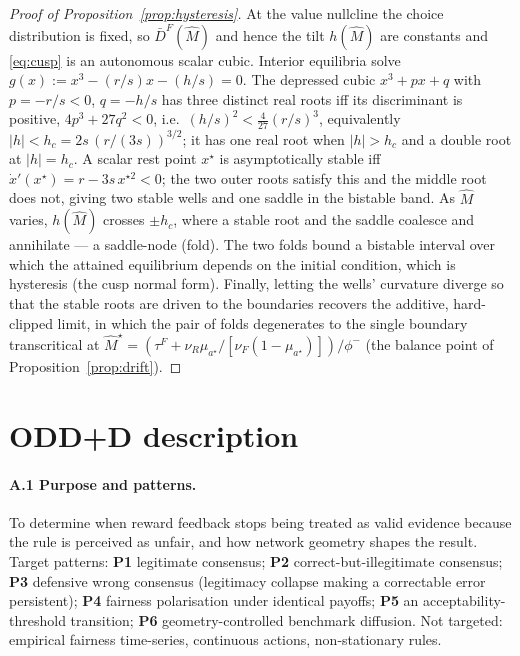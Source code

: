 \documentclass[11pt]{article}
\newcommand{\1}{\mathbf{1}}
\begin{document}
\begin{proof}[Proof of Proposition~\ref{prop:hysteresis}]
At the value nullcline the choice distribution is fixed, so
$\bar D^F(\hat M)$ and hence the tilt $h(\hat M)$ are constants and \eqref{eq:cusp}
is an autonomous scalar cubic. Interior equilibria solve $g(x):=x^3-(r/s)x-(h/s)=0$.
The depressed cubic $x^3+px+q$ with $p=-r/s<0$, $q=-h/s$ has three distinct real
roots iff its discriminant is positive, $4p^3+27q^2<0$, i.e.\
$(h/s)^2<\tfrac{4}{27}(r/s)^3$, equivalently $|h|<h_c=2s\,(r/(3s))^{3/2}$; it has
one real root when $|h|>h_c$ and a double root at $|h|=h_c$. A scalar rest point
$x^\star$ is asymptotically stable iff $\dot x'(x^\star)=r-3s\,x^{\star2}<0$; the
two outer roots satisfy this and the middle root does not, giving two stable wells
and one saddle in the bistable band. As $\hat M$ varies, $h(\hat M)$ crosses
$\pm h_c$, where a stable root and the saddle coalesce and annihilate --- a
saddle-node (fold). The two folds bound a bistable interval over which the
attained equilibrium depends on the initial condition, which is hysteresis (the
cusp normal form). Finally, letting the wells' curvature diverge so that the
stable roots are driven to the boundaries recovers the additive, hard-clipped
limit, in which the pair of folds degenerates to the single boundary transcritical
at $\hat M^\star=(\tau^F+\nu_R\mu_{a^\star}/[\nu_F(1-\mu_{a^\star})])/\phi^-$
(the balance point of Proposition~\ref{prop:drift}).
\end{proof}

\section{ODD+D description}
\label{app:odd}

\paragraph{A.1 Purpose and patterns.}
To determine when reward feedback stops being treated as valid evidence because
the rule is perceived as unfair, and how network geometry shapes the result.
Target patterns: \textbf{P1} legitimate consensus; \textbf{P2}
correct-but-illegitimate consensus; \textbf{P3} defensive wrong consensus
(legitimacy collapse making a correctable error persistent); \textbf{P4} fairness
polarisation under identical payoffs; \textbf{P5} an acceptability-threshold
transition; \textbf{P6} geometry-controlled benchmark diffusion. Not targeted:
empirical fairness time-series, continuous actions, non-stationary rules.
\end{document}
